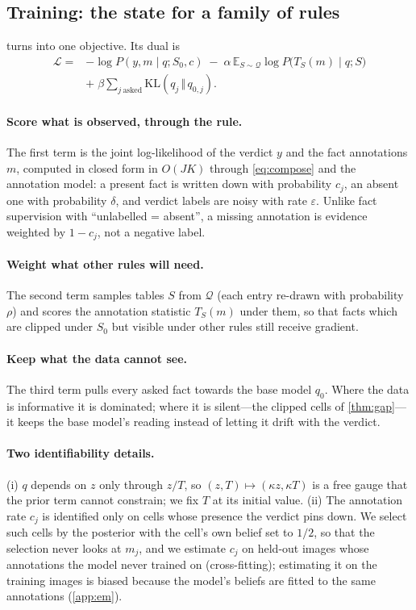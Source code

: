\subsection{Training: the state for a family of rules}
\label{sec:method-train}
 turns into one objective. Its dual is
\begin{equation}
\begin{aligned}
\mathcal L={}&-\log P(y,m\mid q;S_0,c)\;-\;\alpha\,\mathbb E_{S\sim\mathcal Q}\log P\big(T_S(m)\mid q;S\big)\\
&+\;\beta\textstyle\sum_{j\ \text{asked}}\mathrm{KL}(q_j\,\Vert\,q_{0,j}).
\end{aligned}
\label{eq:obj}
\end{equation}

\paragraph{Score what is observed, through the rule.} The first term is the joint log-likelihood of the verdict $y$ and the fact annotations $m$, computed in closed form in $O(JK)$ through \cref{eq:compose} and the annotation model: a present fact is written down with probability $c_j$, an absent one with probability $\delta$, and verdict labels are noisy with rate $\varepsilon$. Unlike fact supervision with ``unlabelled = absent'', a missing annotation is evidence weighted by $1-c_j$, not a negative label.

\paragraph{Weight what other rules will need.} The second term samples tables $S$ from $\mathcal Q$ (each entry re-drawn with probability $\rho$) and scores the annotation statistic $T_S(m)$ under them, so that facts which are clipped under $S_0$ but visible under other rules still receive gradient.

\paragraph{Keep what the data cannot see.} The third term pulls every asked fact towards the base model $q_0$. Where the data is informative it is dominated; where it is silent---the clipped cells of \cref{thm:gap}---it keeps the base model's reading instead of letting it drift with the verdict.

\paragraph{Two identifiability details.} (i) $q$ depends on $z$ only through $z/T$, so $(z,T)\mapsto(\kappa z,\kappa T)$ is a free gauge that the prior term cannot constrain; we fix $T$ at its initial value. (ii) The annotation rate $c_j$ is identified only on cells whose presence the verdict pins down. We select such cells by the posterior with the cell's own belief set to $1/2$, so that the selection never looks at $m_j$, and we estimate $c_j$ on held-out images whose annotations the model never trained on (cross-fitting); estimating it on the training images is biased because the model's beliefs are fitted to the same annotations (\cref{app:em}).
